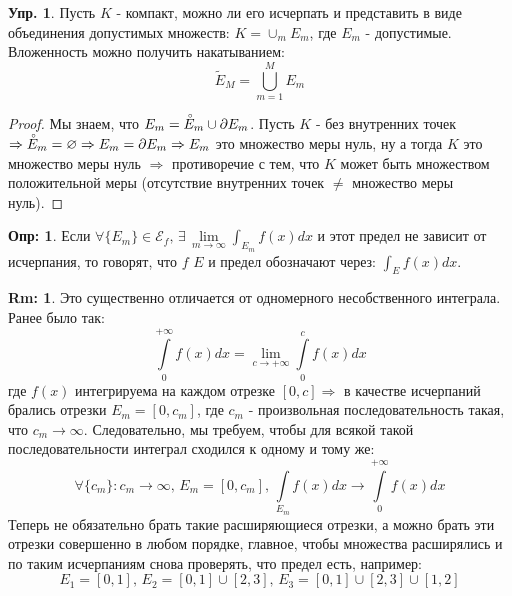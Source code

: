 \documentclass[12pt]{article}
\newcommand{\ME}{\mathcal{E}}
\newcommand{\VN}{\varnothing}
\theoremstyle{definition}
\newtheorem{defn}{Опр:}
\newtheorem{rem}{Rm:}
\newtheorem{exrc}{Упр.}
\newcommand{\ddint}[2]{\displaystyle\int\limits_{#1}^{#2}}
\newcommand{\wte}[1]{\widetilde{#1}}
\newcommand{\Circ}[1]{\accentset{\circ}{#1}}
\begin{document}
\begin{exrc}
	Пусть $K$ - компакт, можно ли его исчерпать и представить в виде объединения допустимых множеств: $K = \cup_m E_m$, где $E_m$ - допустимые. Вложенность можно получить накатыванием: 
	$$
		\wte{E}_M = \bigcup\limits_{m = 1}^{M}E_m
	$$
\end{exrc}
\begin{proof}
	Мы знаем, что $E_m = \Circ{E}_m \cup \partial E_m$. Пусть $K$ - без внутренних точек $\Rightarrow \Circ{E}_m = \VN \Rightarrow E_m = \partial E_m \Rightarrow E_m$ это множество меры нуль, ну а тогда $K$ это множество меры нуль $\Rightarrow$ противоречие с тем, что $K$ может быть множеством положительной меры (отсутствие внутренних точек $\neq$ множество меры нуль).
\end{proof}

\begin{defn}
	Если $\forall \{E_m\} \in \ME_f, \, \exists \, \lim\limits_{m \to \infty}\int_{E_m}f(x)dx$ и этот предел не зависит от исчерпания, то говорят, что $f$  $E$ и предел обозначают через: $\int_E f(x)dx$.
\end{defn}
\begin{rem}
	Это существенно отличается от одномерного несобственного интеграла. Ранее было так:
	$$
		\ddint{0}{+\infty}f(x)dx = \lim\limits_{c \to +\infty}\ddint{0}{c}f(x)dx
	$$
	где $f(x)$ интегрируема на каждом отрезке $[0,c] \Rightarrow$ в качестве исчерпаний брались отрезки $E_m = [0,c_m]$, где $c_m$ - произвольная последовательность такая, что $c_m \to \infty$. Следовательно, мы требуем, чтобы для всякой такой последовательности интеграл сходился к одному и тому же:
	$$
		\forall \{c_m\} \colon c_m \to \infty, \, E_m = [0,c_m], \, \ddint{E_m}{}f(x)dx \to \ddint{0}{+\infty}f(x)dx
	$$
	Теперь не обязательно брать такие расширяющиеся отрезки, а можно брать эти отрезки совершенно в любом порядке, главное, чтобы множества расширялись и по таким исчерпаниям снова проверять, что предел есть, например:
	$$
		E_1 = [0,1], \, E_2 = [0,1]\cup [2,3], \, E_3 = [0,1] \cup [2,3] \cup [1,2]
	$$
\end{rem}
\end{document}
